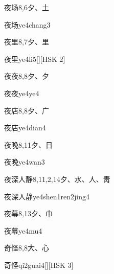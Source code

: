 \begin{entry}{夜场}{8,6}{⼣、⼟}
  \begin{phonetics}{夜场}{ye4chang3}
  \end{phonetics}
\end{entry}

\begin{entry}{夜里}{8,7}{⼣、⾥}
  \begin{phonetics}{夜里}{ye4li5}[][HSK 2]
  \end{phonetics}
\end{entry}

\begin{entry}{夜夜}{8,8}{⼣、⼣}
  \begin{phonetics}{夜夜}{ye4ye4}
  \end{phonetics}
\end{entry}

\begin{entry}{夜店}{8,8}{⼣、⼴}
  \begin{phonetics}{夜店}{ye4dian4}
  \end{phonetics}
\end{entry}

\begin{entry}{夜晚}{8,11}{⼣、⽇}
  \begin{phonetics}{夜晚}{ye4wan3}
  \end{phonetics}
\end{entry}

\begin{entry}{夜深人静}{8,11,2,14}{⼣、⽔、⼈、⾭}
  \begin{phonetics}{夜深人静}{ye4shen1ren2jing4}
  \end{phonetics}
\end{entry}

\begin{entry}{夜幕}{8,13}{⼣、⼱}
  \begin{phonetics}{夜幕}{ye4mu4}
  \end{phonetics}
\end{entry}

\begin{entry}{奇怪}{8,8}{⼤、⼼}
  \begin{phonetics}{奇怪}{qi2guai4}[][HSK 3]
  \end{phonetics}
\end{entry}

